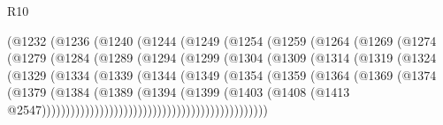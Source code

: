 \begin{lexlean}{R10}
\begin{coremodule}
{{{{{{{{{{{{{{{{{{{{{{{{{{{{{{{{{{{{{{{{{{{{{{{{{{{{{{{{{{{{{{{{{{{{{{{{{{{{{{{{{{{{{{{{{{{{{{{{{{{{{{{{{{{{                      (@1232
                        (@1236
                          (@1240
                            (@1244
                              (@1249
                                (@1254
                                  (@1259
                                    (@1264
                                      (@1269
                                        (@1274
                                          (@1279
                                            (@1284
                                              (@1289
                                                (@1294
                                                  (@1299
                                                    (@1304
                                                      (@1309
                                                        (@1314
                                                          (@1319
                                                            (@1324
                                                              (@1329
                                                                (@1334
                                                                  (@1339
                                                                    (@1344
                                                                      (@1349
                                                                        (@1354
                                                                          (@1359
                                                                            (@1364
                                                                              (@1369
                                                                                (@1374
                                                                                  (@1379
                                                                                    (@1384
                                                                                      (@1389
                                                                                        (@1394
                                                                                          (@1399
                                                                                            (@1403
                                                                                              (@1408
                                                                                                (@1413
                                                                                                  @2547)))))))))))))))))))))))))))))))))))))))))))))))
}}}}}}}}}}}}}}}}}}}}}}}}}}}}}}}}}}}}}}}}}}}}}}}}}}}}}}}}}}}}}}}}}}}}}}}}}}}}}}}}}}}}}}}}}}}}}}}}}}}}}}}}}}}}
\end{coremodule}
\end{lexlean}
